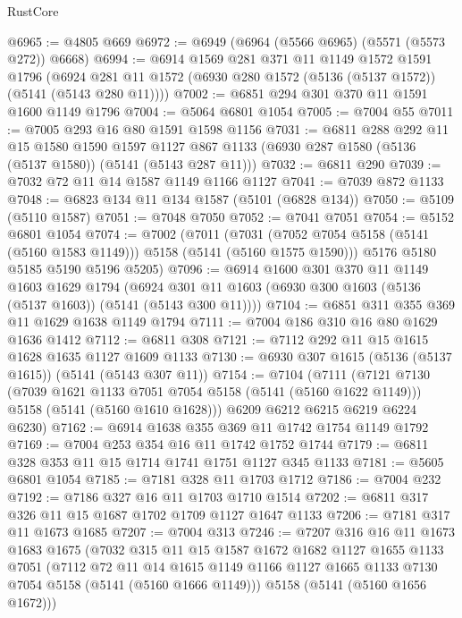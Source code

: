 \begin{lexlean}{RustCore}
\begin{coremodule}
@6965 := @4805 @669
@6972 := @6949 (@6964 (@5566 @6965) (@5571 (@5573 @272)) @6668)
@6994 := @6914
    @1569
    @281
    @371
    @11
    @1149
    @1572
    @1591
    @1796
    (@6924 @281 @11 @1572 (@6930 @280 @1572 (@5136 (@5137 @1572)) (@5141 (@5143 @280 @11))))
@7002 := @6851 @294 @301 @370 @11 @1591 @1600 @1149 @1796
@7004 := @5064 @6801 @1054
@7005 := @7004 @55
@7011 := @7005 @293 @16 @80 @1591 @1598 @1156
@7031 := @6811
    @288
    @292
    @11
    @15
    @1580
    @1590
    @1597
    @1127
    @867
    @1133
    (@6930 @287 @1580 (@5136 (@5137 @1580)) (@5141 (@5143 @287 @11)))
@7032 := @6811 @290
@7039 := @7032 @72 @11 @14 @1587 @1149 @1166 @1127
@7041 := @7039 @872 @1133
@7048 := @6823 @134 @11 @134 @1587 (@5101 (@6828 @134))
@7050 := @5109 (@5110 @1587)
@7051 := @7048 @7050
@7052 := @7041 @7051
@7054 := @5152 @6801 @1054
@7074 := @7002
    (@7011
      (@7031 (@7052 @7054 @5158 (@5141 (@5160 @1583 @1149))) @5158 (@5141 (@5160 @1575 @1590)))
      @5176
      @5180
      @5185
      @5190
      @5196
      @5205)
@7096 := @6914
    @1600
    @301
    @370
    @11
    @1149
    @1603
    @1629
    @1794
    (@6924 @301 @11 @1603 (@6930 @300 @1603 (@5136 (@5137 @1603)) (@5141 (@5143 @300 @11))))
@7104 := @6851 @311 @355 @369 @11 @1629 @1638 @1149 @1794
@7111 := @7004 @186 @310 @16 @80 @1629 @1636 @1412
@7112 := @6811 @308
@7121 := @7112 @292 @11 @15 @1615 @1628 @1635 @1127 @1609 @1133
@7130 := @6930 @307 @1615 (@5136 (@5137 @1615)) (@5141 (@5143 @307 @11))
@7154 := @7104
    (@7111
      (@7121
        @7130
        (@7039 @1621 @1133 @7051 @7054 @5158 (@5141 (@5160 @1622 @1149)))
        @5158
        (@5141 (@5160 @1610 @1628)))
      @6209
      @6212
      @6215
      @6219
      @6224
      @6230)
@7162 := @6914 @1638 @355 @369 @11 @1742 @1754 @1149 @1792
@7169 := @7004 @253 @354 @16 @11 @1742 @1752 @1744
@7179 := @6811 @328 @353 @11 @15 @1714 @1741 @1751 @1127 @345 @1133
@7181 := @5605 @6801 @1054
@7185 := @7181 @328 @11 @1703 @1712
@7186 := @7004 @232
@7192 := @7186 @327 @16 @11 @1703 @1710 @1514
@7202 := @6811 @317 @326 @11 @15 @1687 @1702 @1709 @1127 @1647 @1133
@7206 := @7181 @317 @11 @1673 @1685
@7207 := @7004 @313
@7246 := @7207
    @316
    @16
    @11
    @1673
    @1683
    @1675
    (@7032
      @315
      @11
      @15
      @1587
      @1672
      @1682
      @1127
      @1655
      @1133
      @7051
      (@7112
        @72
        @11
        @14
        @1615
        @1149
        @1166
        @1127
        @1665
        @1133
        @7130
        @7054
        @5158
        (@5141 (@5160 @1666 @1149)))
      @5158
      (@5141 (@5160 @1656 @1672)))

\end{coremodule}
\end{lexlean}
